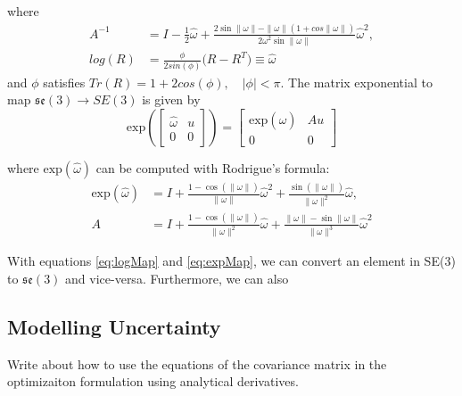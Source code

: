 \documentclass[0-suturing.tex]{subfiles}
\begin{document}
\noindent where
\begin{equation*}
\begin{aligned}
    A^{-1} &= I - \frac{1}{2}\hat{\omega} +
\frac{2\sin\|\omega\| - \|\omega\|(1+cos\|\omega\|) }{2\omega^{2} \sin\|\omega\|}\hat{\omega}^{2},  \\
log(R) &= \frac{\phi}{2sin(\phi)}\big(R - R^T\big) \equiv \hat{\omega}
\end{aligned}
\end{equation*}
and $\phi$ satisfies $Tr(R) = 1+2cos(\phi), \quad |\phi|<\pi$.
\vspace{5pt}
\noindent The matrix exponential to map $\mathfrak{se}(3) \to SE(3)$ is given by
\begin{equation}
    \text{exp}\left(
        \begin{bmatrix}
            \hat{\omega} & u \\
            0 & 0
        \end{bmatrix}
    \right)  =
    \begin{bmatrix}
        \text{exp}(\hat{\omega}) & Au \\
        0 & 0
    \end{bmatrix}
    \label{eq:expMap}
\end{equation}

\noindent where $\text{exp}(\hat{\omega})$ can be computed with Rodrigue's formula:
\begin{equation*}
\begin{aligned}
    \text{exp}(\hat{\omega}) &= I + \frac{1-\cos(\|\omega\|)}{\|\omega\|}\hat{\omega}^2 +
    \frac{\sin(\|\omega\|)}{\|\omega\|^2}\hat{\omega},\\
    A &= I + \frac{1-\cos(\|\omega\|)}{\|\omega\|^2}\hat{\omega} + \frac{\|\omega\| - \sin\|\omega\|}{\|\omega\|^3}\hat{\omega}^2
\end{aligned}
\end{equation*}

With equations \eqref{eq:logMap} and \eqref{eq:expMap}, we can convert an element in SE(3) to $\mathfrak{se}(3)$ and vice-versa. Furthermore, we can also 

\subsection{Modelling Uncertainty }
Write about how to use the equations of the covariance matrix in the optimizaiton formulation using analytical derivatives.
\end{document}

